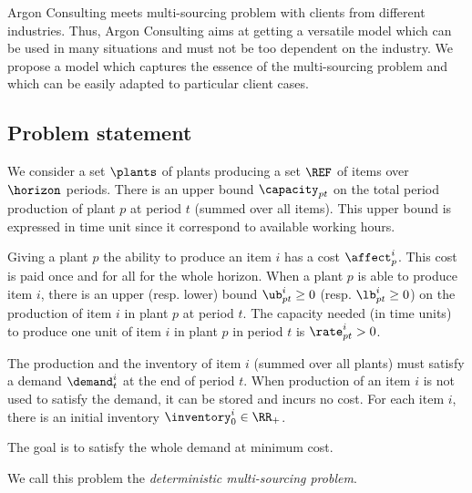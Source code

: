 Argon Consulting meets multi-sourcing problem with clients from different industries.
Thus, Argon Consulting aims at getting a versatile model which can be used in many situations and must not be too dependent on the industry.
We propose a model which captures the essence of the multi-sourcing problem and which can be easily adapted to particular client cases.


\subsection{Problem statement}
\label{sec:multi-sourcing:deterministic:introduction:problem_statement}


We consider a set $\plants$ of plants producing a set $\REF$ of items over $\horizon$ periods.
There is an upper bound $\capacity_{pt}$ on the total period production of plant $p$ at period $t$ (summed over all items).
This upper bound is expressed in time unit since it correspond to available working hours.


Giving a plant $p$ the ability to produce an item $i$ has a cost $\affect_p^i$.
This cost is paid once and for all for the whole horizon.
When a plant $p$ is able to produce item $i$, there is an upper (resp. lower) bound $\ub_{pt}^i\ge 0$ (resp. $\lb_{pt}^i\ge 0$) on the production of item $i$ in plant $p$ at period $t$.
The capacity needed (in time units) to produce one unit of item $i$ in plant $p$ in period $t$ is $\rate_{pt}^i>0$.


The production and the inventory of item $i$ (summed over all plants) must satisfy a demand $\demand_t^i$ at the end of period $t$.
When production of an item $i$ is not used to satisfy the demand, it can be stored and incurs no cost.
For each item $i$, there is an initial inventory $\inventory_0^i\in\RR_+$.


The goal is to satisfy the whole demand at minimum cost.


We call this problem the \emph{deterministic multi-sourcing problem}.


\medskip


